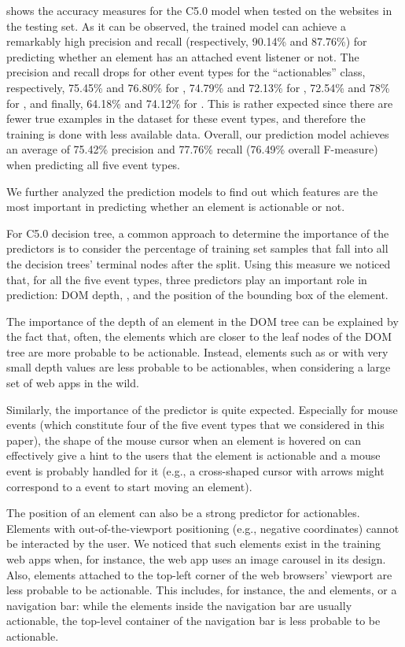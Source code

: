 shows the accuracy measures for the C5.0 model
when tested on the websites in the testing set.
As it can be observed, the trained model can achieve a remarkably high precision and recall
(respectively, 90.14\% and 87.76\%)
for predicting whether an element has an attached  event listener or not.
The precision and recall drops for other event types for the ``actionables'' class,
respectively,
75.45\% and 76.80\% for ,
74.79\% and 72.13\% for ,
72.54\% and 78\% for ,
and finally,
64.18\% and 74.12\% for .
This is rather expected since there are fewer true examples in the dataset
for these event types, 
and therefore the training is done with less available data.
Overall, our prediction model achieves an average of
75.42\% precision and
77.76\% recall (76.49\% overall F-measure)
when predicting all five event types. 

We further analyzed the prediction models 
to find out which features
are the most important 
in predicting whether an element is actionable or not.


For C5.0 decision tree,
a common approach to determine the importance of the predictors 
is to consider the percentage of training set samples that fall into all the decision trees' terminal nodes after the split.
Using this measure we noticed that, for all the five event types,
three predictors play an important role in prediction:
DOM depth,
,
and the position of the bounding box of the element.

The importance of the depth of an element in the DOM tree can be explained by the fact that,
often,
the elements which are closer to the leaf nodes of the DOM tree
are more probable to be actionable.
Instead, elements such as  or 
with very small depth values
are less probable to be actionables,
when considering a large set of web apps in the wild.

Similarly, the importance of the  predictor is quite expected.
Especially for mouse events (which constitute four of the five event types that we considered in this paper),
the shape of the mouse cursor when an element is hovered on can effectively give a hint to the users
that the element is actionable and a mouse event is probably handled for it
(e.g., a cross-shaped cursor with arrows
might correspond to a  event to start moving an element).

The position of an element can also be a strong predictor
for actionables.
Elements with out-of-the-viewport positioning (e.g., negative coordinates)
cannot be interacted by the user.
We noticed that such elements exist in the training web apps when,
for instance,
the web app uses an image carousel in its design.
Also, elements attached to the top-left corner of the web browsers' viewport
are less probable to be actionable.
This includes, for instance, the  and  elements,
or a navigation bar:
while the elements inside the navigation bar are usually actionable, 
the top-level container of the navigation bar is less probable to be actionable.


